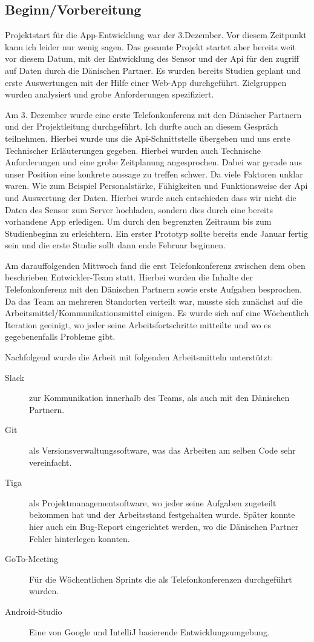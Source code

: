 \subsection{Beginn/Vorbereitung}
Projektstart für die App-Entwicklung  war der 3.Dezember. Vor diesem Zeitpunkt kann ich leider nur wenig sagen. Das gesamte Projekt startet aber bereits weit vor diesem Datum, mit der Entwicklung des Sensor und der Api für den zugriff auf Daten durch die Dänischen Partner. Es wurden bereits Studien geplant und erste Auswertungen mit der Hilfe einer Web-App durchgeführt. Zielgruppen wurden analysiert und grobe Anforderungen spezifiziert.

Am 3. Dezember wurde eine erste Telefonkonferenz mit den Dänischer Partnern und der Projektleitung durchgeführt. Ich durfte auch an diesem Gespräch teilnehmen. Hierbei wurde uns die Api-Schnittstelle übergeben und uns erste Technischer Erläuterungen gegeben. Hierbei wurden auch Technische Anforderungen  und eine grobe Zeitplanung angesprochen. Dabei war gerade aus unser Position eine konkrete aussage zu treffen schwer. Da viele Faktoren unklar waren. Wie zum Beispiel Personalstärke, Fähigkeiten und Funktionsweise der Api und Auswertung der Daten.%
Hierbei wurde auch entschieden dass wir nicht die Daten des Sensor zum Server hochladen, sondern dies durch eine bereits vorhandene App erledigen. Um durch den begrenzten Zeitraum bis zum Studienbeginn zu erleichtern. Ein erster Prototyp sollte bereits ende Januar fertig sein und die erste Studie sollt dann ende Februar beginnen.

Am darauffolgenden Mittwoch fand die erst Telefonkonferenz zwischen dem oben beschrieben Entwickler-Team statt. Hierbei wurden die Inhalte der Telefonkonferenz mit den Dänischen Partnern sowie erste Aufgaben besprochen. Da das Team an mehreren Standorten verteilt war, musste sich zunächst auf die Arbeitsmittel/Kommunikationsmittel einigen. Es wurde sich auf eine Wöchentlich Iteration geeinigt, wo jeder seine Arbeitsfortschritte mitteilte und wo es gegebenenfalls Probleme gibt.

Nachfolgend wurde die Arbeit mit folgenden Arbeitsmitteln unterstützt:
\begin{description}
	\item[Slack] zur Kommunikation innerhalb des Teams, als auch mit den Dänischen Partnern.
	\item[Git] als Versionsverwaltungssoftware, was das Arbeiten am selben Code sehr vereinfacht.
	\item[Tiga] als Projektmanagementsoftware, wo jeder seine Aufgaben zugeteilt bekommen hat und der Arbeitsstand festgehalten wurde. Später konnte hier auch ein Bug-Report eingerichtet werden, wo die Dänischen Partner Fehler hinterlegen konnten.
	\item[GoTo-Meeting] Für die Wöchentlichen Sprints die als  Telefonkonferenzen durchgeführt wurden.
	\item[Android-Studio] Eine von Google und IntelliJ  basierende Entwicklungsumgebung.
\end{description}
